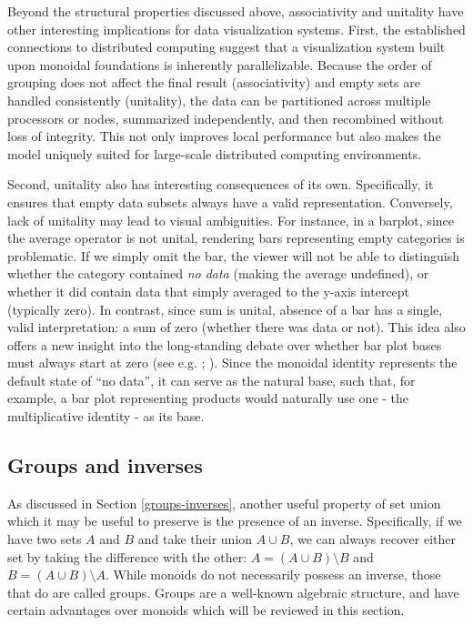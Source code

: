 \documentclass[
  openany]{book}
\theoremstyle{definition}
\theoremstyle{definition}
\theoremstyle{definition}
\theoremstyle{definition}
\theoremstyle{remark}
\begin{document}
Beyond the structural properties discussed above, associativity and unitality have other interesting implications for data visualization systems. First, the established connections to distributed computing suggest that a visualization system built upon monoidal foundations is inherently parallelizable. Because the order of grouping does not affect the final result (associativity) and empty sets are handled consistently (unitality), the data can be partitioned across multiple processors or nodes, summarized independently, and then recombined without loss of integrity. This not only improves local performance but also makes the model uniquely suited for large-scale distributed computing environments.

Second, unitality also has interesting consequences of its own. Specifically, it ensures that empty data subsets always have a valid representation. Conversely, lack of unitality may lead to visual ambiguities. For instance, in a barplot, since the average operator is not unital, rendering bars representing empty categories is problematic. If we simply omit the bar, the viewer will not be able to distinguish whether the category contained \emph{no data} (making the average undefined), or whether it did contain data that simply averaged to the y-axis intercept (typically zero). In contrast, since sum is unital, absence of a bar has a single, valid interpretation: a sum of zero (whether there was data or not). This idea also offers a new insight into the long-standing debate over whether bar plot bases must always start at zero (see e.g. ; ). Since the monoidal identity represents the default state of ``no data'', it can serve as the natural base, such that, for example, a bar plot representing products would naturally use one - the multiplicative identity - as its base.

\subsection{Groups and inverses}\label{discussion-groups-inverses}

As discussed in Section \ref{groups-inverses}, another useful property of set union which it may be useful to preserve is the presence of an inverse. Specifically, if we have two sets \(A\) and \(B\) and take their union \(A \cup B\), we can always recover either set by taking the difference with the other: \(A = (A \cup B) \setminus B\) and \(B = (A \cup B) \setminus A\). While monoids do not necessarily possess an inverse, those that do are called groups. Groups are a well-known algebraic structure, and have certain advantages over monoids which will be reviewed in this section.
\end{document}
